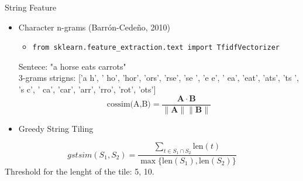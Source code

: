 \begin{frame}{String Feature}

    \begin{itemize}
        \item Character n-grams (Barrón-Cedeño, 2010)
        \vspace{0.2cm}
        \begin{itemize}
            \item \texttt{from sklearn.feature\_extraction.text import TfidfVectorizer} 
        \end{itemize}
        \vspace{0.2cm} 
        Sentece: "a horse eats carrots" \\ \vspace{0.2cm}
        3-grams strigns: ['a h', ' ho', 'hor', 'ors', 'rse', 'se ', 'e e', ' ea', 'eat', 'ats', 'ts ', 's c', ' ca', 'car', 'arr', 'rro', 'rot', 'ots']
        \[ 
            \text{cossim(A,B)} = \frac{\mathbf{A} \cdot \mathbf{B}}{\|\mathbf{A}\| \|\mathbf{B}\|}
             \]
    \end{itemize}

    \begin{itemize}
        \item Greedy String Tiling
    \end{itemize}
    \[
gstsim(S_1, S_2) = \frac{\sum_{t \in S_1 \cap S_2} \text{len}(t)}{\max \{ \text{len}(S_1), \text{len}(S_2) \}}
\]
        Threshold for the lenght of the tile: 5, 10. \\ \vspace{0.1cm}
\end{frame}
